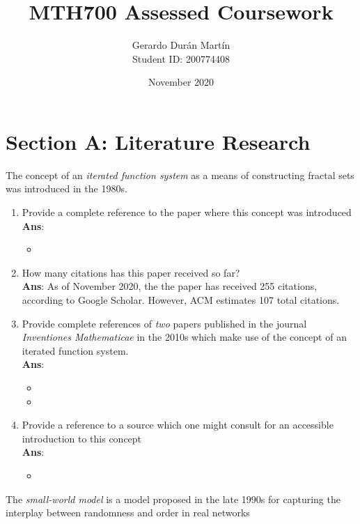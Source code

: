 \documentclass[11pt]{article}
\title{MTH700 Assessed Coursework}
\author{Gerardo Durán Martín\\Student ID: 200774408}
\date{November 2020}
\begin{document}
\maketitle

\section*{Section A: Literature Research}
The concept of an \textit{iterated function system} as a means of constructing fractal sets was introduced in the 1980s.
\begin{enumerate}[label=(\alph*)]
	\item Provide a complete reference to the paper where this concept was introduced \\ \textbf{Ans}:
	\begin{itemize}
	\item {}
	\end{itemize}
	\item How many citations has this paper received so far? \\ \textbf{Ans}: As of November 2020, the the paper has received 255 citations, according to Google Scholar. However, ACM estimates 107 total citations. 
	\item Provide complete references of \textit{two} papers published in the journal \textit{Inventiones Mathematicae} in the 2010s which make use of the concept of an iterated function system. \\ \textbf{Ans}:
	\begin{itemize}
		\item {}
		\item {}
	\end{itemize}
	\item Provide a reference to a source which one might consult for an accessible introduction to this concept \\ \textbf{Ans}:
	\begin{itemize}
		\item {}
	\end{itemize}
\end{enumerate}

The \textit{small-world model} is a model proposed in the late 1990s for capturing the interplay between randomness and order in real networks
\end{document}
